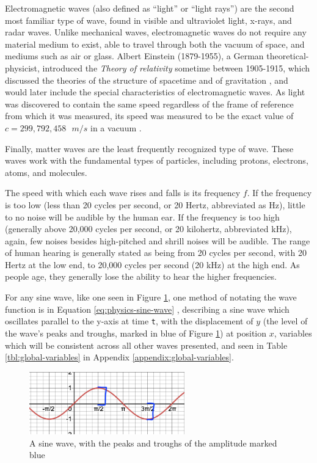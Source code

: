 Electromagnetic waves (also defined as ``light'' or ``light rays'') are the second most familiar type of wave, found in visible and ultraviolet light, x-rays, and radar waves. Unlike mechanical waves, electromagnetic waves do not require any material medium to exist, able to travel through both the vacuum of space, and mediums such as air or glass. Albert Einstein (1879-1955), a German theoretical-physicist, introduced the \textit{Theory of relativity} sometime between 1905-1915, which discussed the theories of the structure of spacetime and of gravitation \cite{Halliday_Resnick_Walker_2005}, and would later include the special characteristics of electromagnetic waves. As light was discovered to contain the same speed regardless of the frame of reference from which it was measured, its speed was measured to be the exact value of $c = 299,792,458 \textrm{ } m/s$ in a vacuum \cite{Halliday_Resnick_Walker_2005}. 

Finally, matter waves are the least frequently recognized type of wave. These waves work with the fundamental types of particles, including protons, electrons, atoms, and molecules. 

The speed with which each wave rises and falls is its frequency $f$. If the frequency is too low (less than 20 cycles per second, or 20 Hertz, abbreviated as Hz), little to no noise will be audible by the human ear. If the frequency is too high (generally above 20,000 cycles per second, or 20 kilohertz, abbreviated kHz), again, few noises besides high-pitched and shrill noises will be audible. The range of human hearing is generally stated as being from 20 cycles per second, with 20 Hertz at the low end, to 20,000 cycles per second (20 kHz) at the high end. As people age, they generally lose the ability to hear the higher frequencies.

For any sine wave, like one seen in Figure \ref{fig:sine-wave-with-amplitude}, one method of notating the wave function is in Equation \ref{eq:physics-sine-wave} \cite{Halliday_Resnick_Walker_2005}, describing a sine wave which oscillates parallel to the y-axis at time \texttt{t}, with the displacement of $y$ (the level of the wave's peaks and troughs, marked in blue of Figure \ref{fig:sine-wave-with-amplitude}) at position $x$, variables which will be consistent across all other waves presented, and seen in Table \ref{tbl:global-variables} in Appendix \ref{appendix:global-variables}.

\begin{figure}
    \centering
    \includegraphics[width=0.6\textwidth]{figures/sine-wave-with-amplitude.png}
    \caption{A sine wave, with the peaks and troughs of the amplitude marked blue}
    \label{fig:sine-wave-with-amplitude}
\end{figure}

